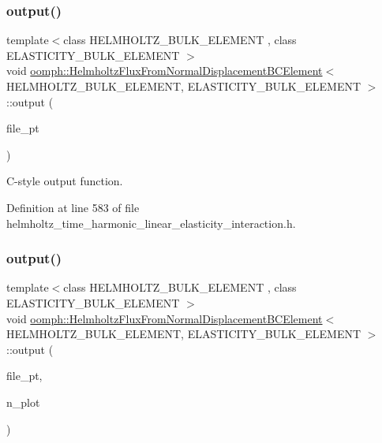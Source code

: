 \subsubsection{\texorpdfstring{output()}{output()}\hspace{0.1cm}{\footnotesize\ttfamily [3/4]}}
{\footnotesize\ttfamily template$<$class H\+E\+L\+M\+H\+O\+L\+T\+Z\+\_\+\+B\+U\+L\+K\+\_\+\+E\+L\+E\+M\+E\+NT , class E\+L\+A\+S\+T\+I\+C\+I\+T\+Y\+\_\+\+B\+U\+L\+K\+\_\+\+E\+L\+E\+M\+E\+NT $>$ \\
void \hyperlink{classoomph_1_1HelmholtzFluxFromNormalDisplacementBCElement}{oomph\+::\+Helmholtz\+Flux\+From\+Normal\+Displacement\+B\+C\+Element}$<$ H\+E\+L\+M\+H\+O\+L\+T\+Z\+\_\+\+B\+U\+L\+K\+\_\+\+E\+L\+E\+M\+E\+NT, E\+L\+A\+S\+T\+I\+C\+I\+T\+Y\+\_\+\+B\+U\+L\+K\+\_\+\+E\+L\+E\+M\+E\+NT $>$\+::output (\begin{DoxyParamCaption}\item[{F\+I\+LE $\ast$}]{file\+\_\+pt }\end{DoxyParamCaption})\hspace{0.3cm}{\ttfamily [inline]}}



C-\/style output function. 



Definition at line 583 of file helmholtz\+\_\+time\+\_\+harmonic\+\_\+linear\+\_\+elasticity\+\_\+interaction.\+h.

\mbox{\label{classoomph_1_1HelmholtzFluxFromNormalDisplacementBCElement_a3a08931249b5071b11ec8082848cc94e}} 
\subsubsection{\texorpdfstring{output()}{output()}\hspace{0.1cm}{\footnotesize\ttfamily [4/4]}}
{\footnotesize\ttfamily template$<$class H\+E\+L\+M\+H\+O\+L\+T\+Z\+\_\+\+B\+U\+L\+K\+\_\+\+E\+L\+E\+M\+E\+NT , class E\+L\+A\+S\+T\+I\+C\+I\+T\+Y\+\_\+\+B\+U\+L\+K\+\_\+\+E\+L\+E\+M\+E\+NT $>$ \\
void \hyperlink{classoomph_1_1HelmholtzFluxFromNormalDisplacementBCElement}{oomph\+::\+Helmholtz\+Flux\+From\+Normal\+Displacement\+B\+C\+Element}$<$ H\+E\+L\+M\+H\+O\+L\+T\+Z\+\_\+\+B\+U\+L\+K\+\_\+\+E\+L\+E\+M\+E\+NT, E\+L\+A\+S\+T\+I\+C\+I\+T\+Y\+\_\+\+B\+U\+L\+K\+\_\+\+E\+L\+E\+M\+E\+NT $>$\+::output (\begin{DoxyParamCaption}\item[{F\+I\+LE $\ast$}]{file\+\_\+pt,  }\item[{const unsigned \&}]{n\+\_\+plot }\end{DoxyParamCaption})\hspace{0.3cm}{\ttfamily [inline]}}



